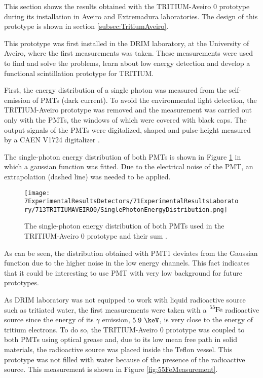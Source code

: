 This section shows the results obtained with the TRITIUM-Aveiro 0 prototype during its installation in Aveiro and Extremadura laboratories. The design of this prototype is shown in section \ref{subsec:TritiumAveiro}.

This prototype was first installed in the DRIM laboratory, at the University of Aveiro, where the first measurements was taken. These measurements were used to find and solve the problems, learn about low energy detection and develop a functional scintillation prototype for TRITIUM. 

First, the energy distribution of a single photon was measured from the self-emission of PMTs (dark current). To avoid the environmental light detection, the TRITIUM-Aveiro prototype was removed and the measurement was carried out only with the PMTs, the windows of which were covered with black caps. The output signals of the PMTs were digitalized, shaped and pulse-height measured by a CAEN V1724 digitalizer \cite{CAENV1724}.

The single-photon energy distribution of both PMTs is shown in Figure \ref{fig:SinglePhotonEnergyDistribution} in which a gaussian function was fitted. Due to the electrical noise of the PMT, an extrapolation (dashed line) was needed to be applied.

\begin{figure}[h]
\centering
\texttt{[image: 7ExperimentalResultsDetectors/71ExperimentalResultsLaboratory/713TRITIUMAVEIRO0/SinglePhotonEnergyDistribution.png]}
\caption{The single-photon energy distribution of both PMTs used in the TRITIUM-Aveiro 0 prototype and their sum \cite{ExperimentalPaperCarlos}.\label{fig:SinglePhotonEnergyDistribution}}
\end{figure}

As can be seen, the distribution obtained with PMT1 deviates from the Gaussian function due to the higher noise in the low energy channels. This fact indicates that it could be interesting to use PMT with very low background for future prototypes.

As DRIM laboratory was not equipped to work with liquid radioactive source such as tritiated water, the first measurements were taken with a $\ce{^{55}Fe}$ radioactive source since the energy of its $\gamma$ emission, $5.9~\keV$, is very close to the energy of tritium electrons. To do so, the TRITIUM-Aveiro 0 prototype was coupled to both PMTs using optical grease and, due to its low mean free path in solid materials, the radioactive source was placed inside the Teflon vessel. This prototype was not filled with water because of the presence of the radioactive source. This measurement is shown in Figure \ref{fig:55FeMeasurement}.

